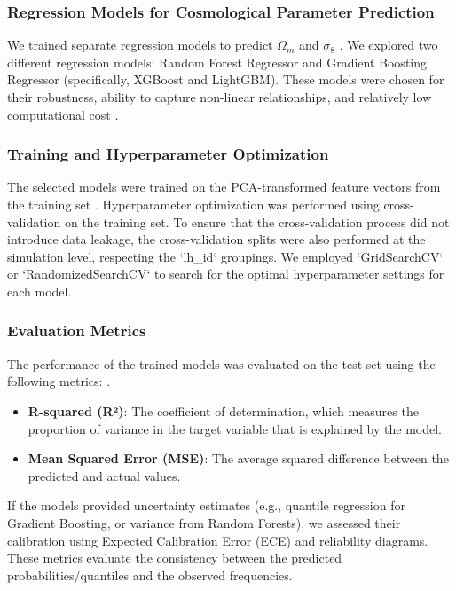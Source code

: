 \documentclass[twocolumn]{aastex631}
\begin{document}
\subsubsection{Regression Models for Cosmological Parameter Prediction}
We trained separate regression models to predict $\Omega_m$ and $\sigma_8$ \citep{villaescusanavarro2021camelsprojectcosmologyastrophysics}. We explored two different regression models: Random Forest Regressor and Gradient Boosting Regressor (specifically, XGBoost and LightGBM). These models were chosen for their robustness, ability to capture non-linear relationships, and relatively low computational cost \citep{villaescusanavarro2021camelsprojectcosmologyastrophysics,balla2024cosmicscalebenchmarksymmetrypreservingdata,makinen2024hybridsummarystatistics}.

\subsubsection{Training and Hyperparameter Optimization}
The selected models were trained on the PCA-transformed feature vectors from the training set \citep{steiner2009pcatomographyextractinformation,yun2023pcafilteringmethodunbiased,kuiper2025representationlearningfastradio}. Hyperparameter optimization was performed using cross-validation on the training set. To ensure that the cross-validation process did not introduce data leakage, the cross-validation splits were also performed at the simulation level, respecting the `lh\_id` groupings. We employed `GridSearchCV` or `RandomizedSearchCV` to search for the optimal hyperparameter settings for each model.

\subsubsection{Evaluation Metrics}
The performance of the trained models was evaluated on the test set using the following metrics: \citep{mishrasharma2024paperclipassociatingastronomicalobservations,narkedimilli2024predictingstellarmetallicitycomparative,raghav2024photometricanalysispredictingstar}.
\begin{itemize}
    \item \textbf{R-squared (R²)}: The coefficient of determination, which measures the proportion of variance in the target variable that is explained by the model.
    \item \textbf{Mean Squared Error (MSE)}: The average squared difference between the predicted and actual values.
\end{itemize}
If the models provided uncertainty estimates (e.g., quantile regression for Gradient Boosting, or variance from Random Forests), we assessed their calibration using Expected Calibration Error (ECE) \citep{pandya2025siddasinkhorndynamicdomain} and reliability diagrams. These metrics evaluate the consistency between the predicted probabilities/quantiles and the observed frequencies.
\end{document}
